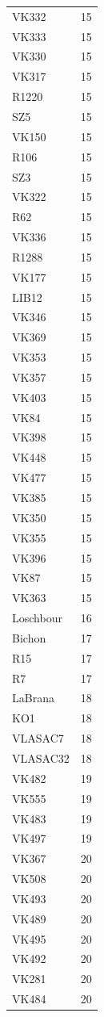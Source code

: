 \begin{longtable}[t]{ll}
VK332 & 15\\
VK333 & 15\\
VK330 & 15\\
VK317 & 15\\
R1220 & 15\\
SZ5 & 15\\
VK150 & 15\\
R106 & 15\\
SZ3 & 15\\
VK322 & 15\\
R62 & 15\\
VK336 & 15\\
R1288 & 15\\
VK177 & 15\\
LIB12 & 15\\
VK346 & 15\\
VK369 & 15\\
VK353 & 15\\
VK357 & 15\\
VK403 & 15\\
VK84 & 15\\
VK398 & 15\\
VK448 & 15\\
VK477 & 15\\
VK385 & 15\\
VK350 & 15\\
VK355 & 15\\
VK396 & 15\\
VK87 & 15\\
VK363 & 15\\
Loschbour & 16\\
Bichon & 17\\
R15 & 17\\
R7 & 17\\
LaBrana & 18\\
KO1 & 18\\
VLASAC7 & 18\\
VLASAC32 & 18\\
VK482 & 19\\
VK555 & 19\\
VK483 & 19\\
VK497 & 19\\
VK367 & 20\\
VK508 & 20\\
VK493 & 20\\
VK489 & 20\\
VK495 & 20\\
VK492 & 20\\
VK281 & 20\\
VK484 & 20\\

\end{longtable}
